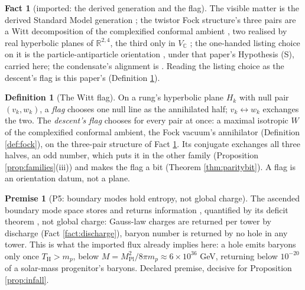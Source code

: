\documentclass[11pt]{article}
\theoremstyle{definition}
\newtheorem{definition}[theorem]{Definition}
\newtheorem{fact}[theorem]{Fact}
\newtheorem{premise}[theorem]{Premise}
\newcommand{\R}{\mathbb{R}}
\newcommand{\C}{\mathbb{C}}
\begin{document}
\begin{fact}[imported: the derived generation and the flag]\label{fact:flag}
The visible matter is the derived Standard Model generation \cite{ButlerT12}; the twistor Fock structure's three pairs are a Witt decomposition of the complexified conformal ambient \cite[Thm.~5.3]{ButlerT9}, two realised by real hyperbolic planes of $\R^{2,4}$, the third only in $V_{\C}$ \cite[proof of Thm.~3.1]{ButlerT9}; the one-handed listing choice on it is the particle-antiparticle orientation \cite[Prop.~5.6]{ButlerT12}, under that paper's Hypothesis (S), carried here; the condensate's alignment is \cite[Prop.~4.3]{ButlerT13}. Reading the listing choice as the descent's flag is this paper's (Definition \ref{def:flag}).
\end{fact}

\begin{definition}[The Witt flag]\label{def:flag}
On a rung's hyperbolic plane $H_k$ with null pair $(v_k, w_k)$, a \emph{flag} chooses one null line as the annihilated half; $v_k \leftrightarrow w_k$ exchanges the two. The \emph{descent's flag} chooses for every pair at once: a maximal isotropic $W$ of the complexified conformal ambient, the Fock vacuum's annihilator (Definition \ref{def:fock}), on the three-pair structure of Fact \ref{fact:flag}. Its conjugate exchanges all three halves, an odd number, which puts it in the other family (Proposition \ref{prop:families}(iii)) and makes the flag a bit (Theorem \ref{thm:paritybit}). A flag is an orientation datum, not a plane.
\end{definition}

\begin{premise}[P5: boundary modes hold entropy, not global charge]\label{prem:ledgercharge}
The ascended boundary mode space stores and returns information \cite[Thm.~11.5, Cor.~11.7]{ButlerT5}, quantified by its deficit theorem \cite[Thm.~9.3]{ButlerT5}, not global charge: Gauss-law charges are returned per tower by discharge (Fact \ref{fact:discharge}), baryon number is returned by no hole in any tower. This is what the imported flux \cite[Assembly~5.4]{ButlerT7} already implies here: a hole emits baryons only once $T_{\mathrm{H}} > m_{p}$, below $M = M_{\mathrm{Pl}}^{2}/8\pi m_{p} \approx 6 \times 10^{36}$ GeV, returning below $10^{-20}$ of a solar-mass progenitor's baryons. Declared premise, decisive for Proposition \ref{prop:infall}.
\end{premise}
\end{document}
